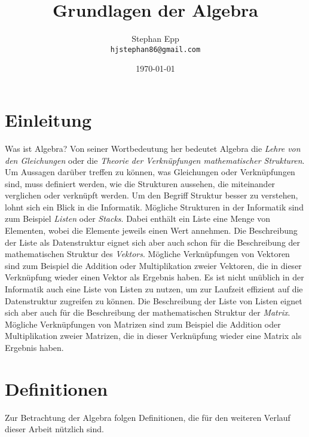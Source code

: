 \documentclass{report}
\title{Grundlagen der Algebra}
\author{Stephan Epp\\\texttt{hjstephan86@gmail.com}}
\date{\today}
\numberwithin{equation}{section}
\begin{document}
	\maketitle
	\vspace{5em}
	\tableofcontents
\chapter{Einleitung}
Was ist Algebra? Von seiner Wortbedeutung her bedeutet Algebra die \textit{Lehre von den Gleichungen} oder die \textit{Theorie der Verknüpfungen mathematischer Strukturen}. Um Aussagen darüber treffen zu können, was Gleichungen oder Verknüpfungen sind, muss definiert werden, wie die Strukturen aussehen, die miteinander verglichen oder verknüpft werden. Um den Begriff Struktur besser zu verstehen, lohnt sich ein Blick in die Informatik. Mögliche Strukturen in der Informatik sind zum Beispiel \textit{Listen} oder \textit{Stacks}. Dabei enthält ein Liste eine Menge von Elementen, wobei die Elemente jeweils einen Wert annehmen. Die Beschreibung der Liste als Datenstruktur eignet sich aber auch schon für die Beschreibung der mathematischen Struktur des \textit{Vektors}. Mögliche Verknüpfungen von Vektoren sind zum Beispiel die Addition oder Multiplikation zweier Vektoren, die in dieser Verknüpfung wieder einen Vektor als Ergebnis haben. Es ist nicht unüblich in der Informatik auch eine Liste von Listen zu nutzen, um zur Laufzeit effizient auf die Datenstruktur zugreifen zu können. Die Beschreibung der Liste von Listen eignet sich aber auch für die Beschreibung der mathematischen Struktur der \textit{Matrix}. Mögliche Verknüpfungen von Matrizen sind zum Beispiel die Addition oder Multiplikation zweier Matrizen, die in dieser Verknüpfung wieder eine Matrix als Ergebnis haben.
\chapter{Definitionen}
Zur Betrachtung der Algebra folgen Definitionen, die für den weiteren Verlauf dieser Arbeit nützlich sind.
\end{document}
